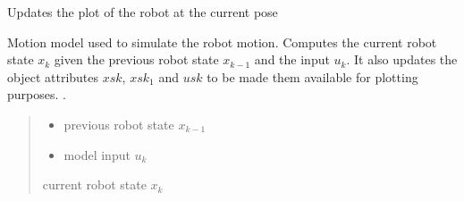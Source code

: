 \documentclass[letterpaper,10pt,english]{sphinxmanual}
\begin{document}
\begin{fulllineitems}
\begin{fulllineitems}
\begin{itemize}
\end{itemize}

\end{fulllineitems}


\begin{fulllineitems}
\label{\detokenize{robot_simulation:SimulatedRobot.SimulatedRobot.PlotRobot}}
\pysigstartsignatures
{}
\pysigstopsignatures
\sphinxAtStartPar
Updates the plot of the robot at the current pose

\end{fulllineitems}


\begin{fulllineitems}
\label{\detokenize{robot_simulation:SimulatedRobot.SimulatedRobot.fs}}
\pysigstartsignatures
{}
\pysigstopsignatures
\sphinxAtStartPar
Motion model used to simulate the robot motion. Computes the current robot state \(x_k\) given the previous robot state \(x_{k-1}\) and the input \(u_k\).
It also updates the object attributes \(xsk\), \(xsk_1\) and  \(usk\) to be made them available for plotting purposes.
.
\begin{quote}\begin{description}
\begin{itemize}
\item {} 
\sphinxAtStartPar
{} \textendash{} previous robot state \(x_{k-1}\)

\item {} 
\sphinxAtStartPar
{} \textendash{} model input \(u_k\)

\end{itemize}

\sphinxAtStartPar
current robot state \(x_k\)

\end{description}\end{quote}


\end{fulllineitems}
\end{fulllineitems}
\end{document}
